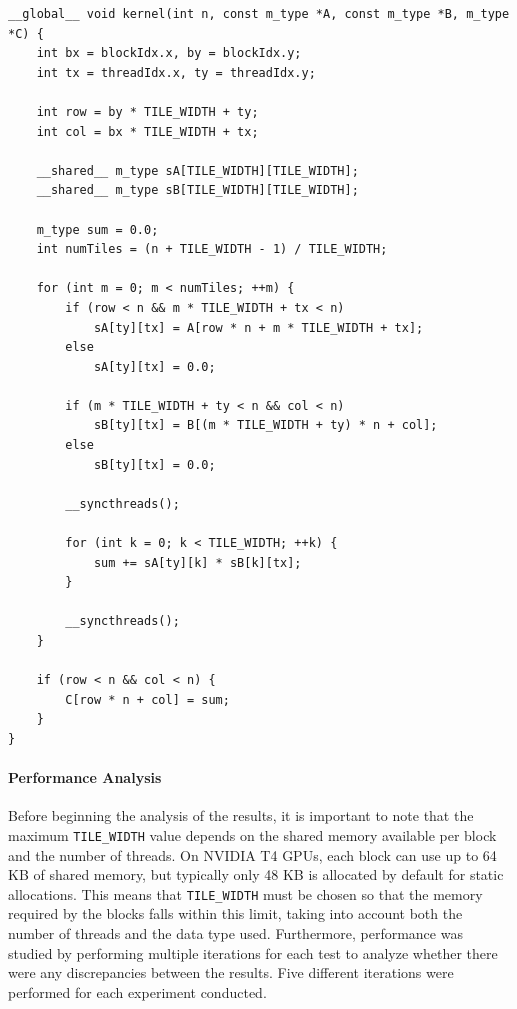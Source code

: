 \begin{lstlisting}[style=CStyle, caption={CUDA implementation of Kernel 2}, label={lst:Kernel_2_code}]
__global__ void kernel(int n, const m_type *A, const m_type *B, m_type *C) {
    int bx = blockIdx.x, by = blockIdx.y;
    int tx = threadIdx.x, ty = threadIdx.y;

    int row = by * TILE_WIDTH + ty;
    int col = bx * TILE_WIDTH + tx;

    __shared__ m_type sA[TILE_WIDTH][TILE_WIDTH];
    __shared__ m_type sB[TILE_WIDTH][TILE_WIDTH];

    m_type sum = 0.0;
    int numTiles = (n + TILE_WIDTH - 1) / TILE_WIDTH;

    for (int m = 0; m < numTiles; ++m) {
        if (row < n && m * TILE_WIDTH + tx < n)
            sA[ty][tx] = A[row * n + m * TILE_WIDTH + tx];
        else
            sA[ty][tx] = 0.0;

        if (m * TILE_WIDTH + ty < n && col < n)
            sB[ty][tx] = B[(m * TILE_WIDTH + ty) * n + col];
        else
            sB[ty][tx] = 0.0;

        __syncthreads();

        for (int k = 0; k < TILE_WIDTH; ++k) {
            sum += sA[ty][k] * sB[k][tx];
        }

        __syncthreads();
    }

    if (row < n && col < n) {
        C[row * n + col] = sum;
    }
}
\end{lstlisting}

\paragraph{Performance Analysis} Before beginning the analysis of the results, it is important to note that the maximum \texttt{TILE\_WIDTH} value depends on the shared memory available per block and the number of threads. On NVIDIA T4 GPUs, each block can use up to 64 KB of shared memory, but typically only 48 KB is allocated by default for static allocations. This means that \texttt{TILE\_WIDTH} must be chosen so that the memory required by the blocks falls within this limit, taking into account both the number of threads and the data type used. Furthermore, performance was studied by performing multiple iterations for each test to analyze whether there were any discrepancies between the results. Five different iterations were performed for each experiment conducted.

